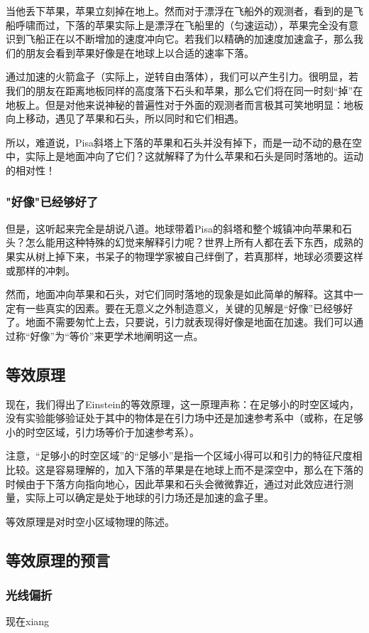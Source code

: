 当他丢下苹果，苹果立刻掉在地上。然而对于漂浮在飞船外的观测者，看到的是飞船呼啸而过，下落的苹果实际上是漂浮在飞船里的（匀速运动），苹果完全没有意识到飞船正在以不断增加的速度冲向它。若我们以精确的加速度加速盒子，那么我们的朋友会看到苹果好像是在地球上以合适的速率下落。

通过加速的火箭盒子（实际上，逆转自由落体），我们可以产生引力。很明显，若我们的朋友在距离地板同样的高度落下石头和苹果，那么它们将在同一时刻“掉”在地板上。但是对他来说神秘的普遍性对于外面的观测者而言极其可笑地明显：地板向上移动，遇见了苹果和石头，所以同时和它们相遇。

所以，难道说，Pisa斜塔上下落的苹果和石头并没有掉下，而是一动不动的悬在空中，实际上是地面冲向了它们？这就解释了为什么苹果和石头是同时落地的。运动的相对性！

\subsubsection{"好像"已经够好了}
但是，这听起来完全是胡说八道。地球带着Pisa的斜塔和整个城镇冲向苹果和石头？怎么能用这种特殊的幻觉来解释引力呢？世界上所有人都在丢下东西，成熟的果实从树上掉下来，书呆子的物理学家被自己绊倒了，若真那样，地球必须要这样或那样的冲刺。

然而，地面冲向苹果和石头，对它们同时落地的现象是如此简单的解释。这其中一定有一些真实的因素。要在无意义之外制造意义，关键的见解是“好像”已经够好了。地面不需要匆忙上去，只要说，引力就表现得好像是地面在加速。我们可以通过称“好像”为“等价”来更学术地阐明这一点。


\subsection{等效原理}
现在，我们得出了Einstein的等效原理，这一原理声称：在足够小的时空区域内，没有实验能够验证处于其中的物体是在引力场中还是加速参考系中（或称，在足够小的时空区域，引力场等价于加速参考系）。

注意，“足够小的时空区域”的“足够小”是指一个区域小得可以和引力的特征尺度相比较。这是容易理解的，加入下落的苹果是在地球上而不是深空中，那么在下落的时候由于下落方向指向地心，因此苹果和石头会微微靠近，通过对此效应进行测量，实际上可以确定是处于地球的引力场还是加速的盒子里。

等效原理是对时空小区域物理的陈述。

\subsection{等效原理的预言}

\subsubsection{光线偏折}
现在xiang



